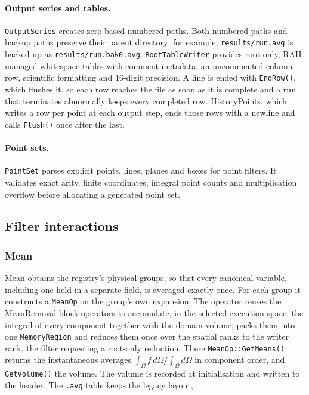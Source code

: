 \paragraph{Output series and tables.}
\texttt{OutputSeries} creates zero-based numbered paths. Both numbered paths
and backup paths preserve their parent directory; for example,
\texttt{results/run.avg} is backed up as
\texttt{results/run.bak0.avg}. \texttt{RootTableWriter} provides root-only,
RAII-managed whitespace tables with comment metadata, an uncommented column
row, scientific formatting and 16-digit precision. A line is ended with
\texttt{EndRow()}, which flushes it, so each row reaches the file as soon as it
is complete and a run that terminates abnormally keeps every completed row.
HistoryPoints, which writes a row per point at each output step, ends those
rows with a newline and calls \texttt{Flush()} once after the last.

\paragraph{Point sets.}
\texttt{PointSet} parses explicit points, lines, planes and boxes for point
filters. It validates exact arity, finite coordinates, integral point counts
and multiplication overflow before allocating a generated point set.

\subsection{Filter interactions}

\subsubsection{Mean}

Mean obtains the registry's physical groups, so that every canonical variable,
including one held in a separate field, is averaged exactly once. For each
group it constructs a \texttt{MeanOp} on the group's own expansion. The
operator reuses the MeanRemoval block operators to accumulate, in the selected
execution space, the integral of every component together with the domain
volume, packs them into one \texttt{MemoryRegion} and reduces them once over
the spatial ranks to the writer rank, the filter requesting a root-only
reduction. There \texttt{MeanOp::GetMeans()} returns the instantaneous
averages $\int_\Omega f\,d\Omega / \int_\Omega d\Omega$ in component order,
and \texttt{GetVolume()} the volume. The volume is recorded at initialisation
and written to the header. The \texttt{.avg}
table keeps the legacy layout,

